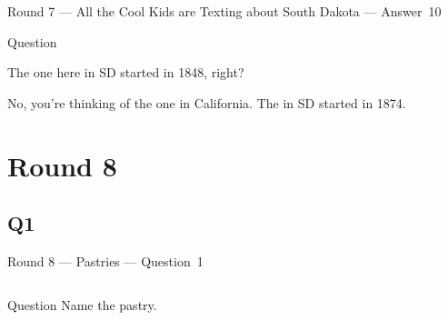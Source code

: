 \documentclass[11pt]{beamer}
\begin{document}
\begin{frame}[t]{Round 7 --- All the Cool Kids are Texting about South Dakota --- \mbox{Answer 10}}
\begin{block}{Question}

\begin{minipage}{0.9\textwidth}
\begin{mdframed}[
    roundcorner=7pt,
    backgroundcolor=black!5,
    linecolor=black!5,
    fontcolor=black,
    ignorelastdescenders]
\begin{flushleft}
{\small{}\selectfont{}
The one here in SD started in 1848, right?
}
\end{flushleft}
\end{mdframed}
\end{minipage}

\hfill{}\begin{minipage}{0.9\textwidth}
\begin{mdframed}[
    roundcorner=7pt,
    backgroundcolor=blue!80!white,
    linecolor=blue!80!white,
    fontcolor=white,
    ignorelastdescenders]
\begin{flushleft}
{\small{}\selectfont{}
No, you're thinking of the one in California.  The \textunderscore{}\textunderscore{}\textunderscore{}\textunderscore{}\textunderscore{}\textunderscore{} \textunderscore{}\textunderscore{}\textunderscore{}\textunderscore{}\textunderscore{}\textunderscore{} in SD started in 1874.
}
\end{flushleft}
\end{mdframed}
\end{minipage}
\end{block}
\end{frame}
\def\thisSectionName{Pastries}
\section{Round 8}
\subsection*{Q1}
\begin{frame}[t]{Round 8 --- Pastries --- \mbox{Question 1}}
\begin{columns}[T,totalwidth=\linewidth]
\begin{column}{0.32\linewidth}
\begin{block}{Question}
Name the pastry.
\end{block}
\end{column}
\begin{column}{0.65\linewidth}
\begin{center}
\texttt{[image: \{Images/zeppole]}.jpg}
\end{center}
\end{column}
\end{columns}
\end{frame}
\end{document}
